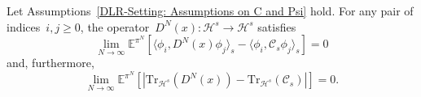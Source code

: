 \begin{lemma}\autocite[Lemma 4.8]{Pillai2012}
  \label{DLR: Lemma Noise approximation}
 Let Assumptions~\ref{DLR-Setting: Assumptions on C and Psi} hold. For any pair of indices~$i, j \geq 0$, the operator~$D^N(x): \mathcal{H}^s \to \mathcal{H}^s$ satisfies
 \begin{equation}
   \label{DLR: Lemma Noise approximation single component statement}
   \lim_{N \to \infty} \mathbb{E}^{\pi^N}[\langle \phi_i, D^N(x) \phi_j \rangle_s - \langle \phi_i, \mathcal{C}_s \phi_j \rangle_s] = 0
 \end{equation}
 and, furthermore,
 \begin{equation}
   \label{DLR: Lemma Noise approximation trace statement}
   \lim_{N \to \infty} \mathbb{E}^{\pi^N}[|\text{Tr}_{\mathcal{H}^s}(D^N(x)) - \text{Tr}_{\mathcal{H}^s}(\mathcal{C}_s)|] = 0.
 \end{equation}

\end{lemma}


